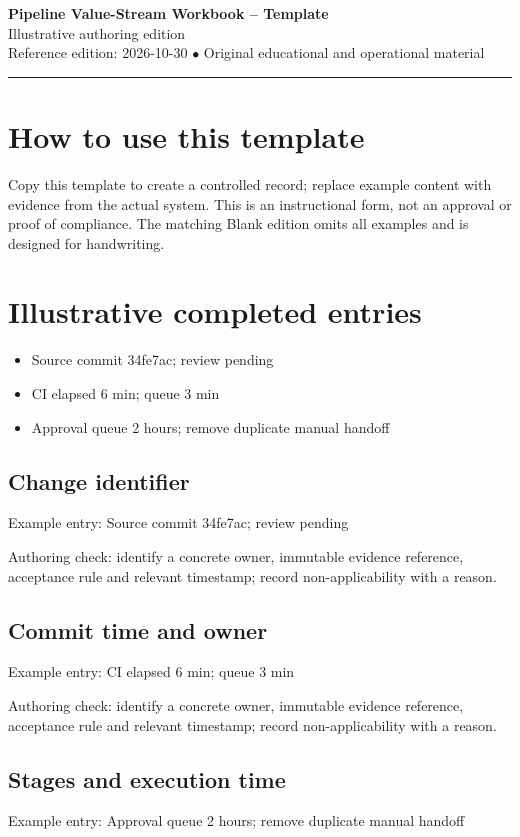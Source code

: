 \documentclass[10pt,letterpaper]{article}
\begin{document}
\begin{center}
{\LARGE\bfseries\color{cdblue}Pipeline Value-Stream Workbook -- Template}\\[7pt]
{\large Illustrative authoring edition}\\[6pt]
{\small Reference edition: 2026-10-30 $\bullet$ Original educational and operational material}
\end{center}
\noindent\color{cdblue}\rule{\linewidth}{1.2pt}\color{black}
\vspace{0.4em}
\section{How to use this template}
Copy this template to create a controlled record; replace example content with evidence from the actual system. This is an instructional form, not an approval or proof of compliance. The matching Blank edition omits all examples and is designed for handwriting.


\section{Illustrative completed entries}
\begin{itemize}
\item Source commit 34fe7ac; review pending
\item CI elapsed 6 min; queue 3 min
\item Approval queue 2 hours; remove duplicate manual handoff
\end{itemize}

\subsection{Change identifier}
Example entry: Source commit 34fe7ac; review pending

Authoring check: identify a concrete owner, immutable evidence reference, acceptance rule and relevant timestamp; record non-applicability with a reason.


\subsection{Commit time and owner}
Example entry: CI elapsed 6 min; queue 3 min

Authoring check: identify a concrete owner, immutable evidence reference, acceptance rule and relevant timestamp; record non-applicability with a reason.


\subsection{Stages and execution time}
Example entry: Approval queue 2 hours; remove duplicate manual handoff
\end{document}

